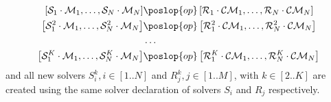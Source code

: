 \begin{align*}
\left[\mathcal{S}_1\cdot\mathcal{M}_1,\dots,\mathcal{S}_{N}\cdot\mathcal{M}_{N}\right] &\poslop{op} \left[\mathcal{R}_1\cdot\mathcal{CM}_1,\dots,\mathcal{R}_{N}\cdot\mathcal{CM}_{N}\right]\\
\left[\mathcal{S}_1^2\cdot\mathcal{M}_1,\dots,\mathcal{S}_{N}^2\cdot\mathcal{M}_{N}\right] &\poslop{op} \left[\mathcal{R}_1^2\cdot\mathcal{CM}_1,\dots,\mathcal{R}_{N}^2\cdot\mathcal{CM}_{N}\right]\\
&\dots\\
\left[\mathcal{S}_1^K\cdot\mathcal{M}_1,\dots,\mathcal{S}_{N}^K\cdot\mathcal{M}_{N}\right] &\poslop{op} \left[\mathcal{R}_1^K\cdot\mathcal{CM}_1,\dots,\mathcal{R}_{N}^K\cdot\mathcal{CM}_{N}\right]\\
\end{align*}
and all new solvers $S_i^k, i\in[1..N]$ and $R_j^k,j\in [1..M]$, with $k\in[2..K]$ are created using the same solver declaration of solvers $S_i$ and $R_j$ respectively.